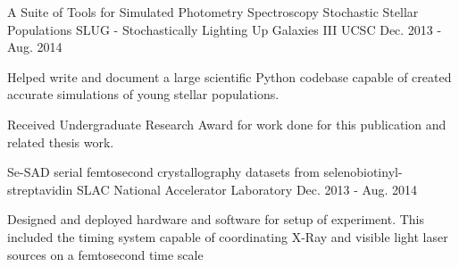 \begin{cventries}
  \cventry
    {A Suite of Tools for Simulated Photometry Spectroscopy Stochastic Stellar Populations}
    {SLUG - Stochastically Lighting Up Galaxies III}
    {UCSC}
    {Dec. 2013 - Aug. 2014}
    {
      \begin{cvitems}
        \item {Helped write and document a large scientific Python codebase capable of created accurate simulations of young stellar populations.}
        \item {Received Undergraduate Research Award for work done for this publication and related thesis work.}
      \end{cvitems}
    }
  \cventry
    {}
    {Se-SAD serial femtosecond crystallography datasets from selenobiotinyl-streptavidin}
    {SLAC National Accelerator Laboratory}
    {Dec. 2013 - Aug. 2014}
    {
      \begin{cvitems}
        \item {Designed and deployed hardware and software for setup of
               experiment. This included the timing system capable of coordinating
               X-Ray and visible light laser sources on a femtosecond time scale}
      \end{cvitems}
    }
\end{cventries}
